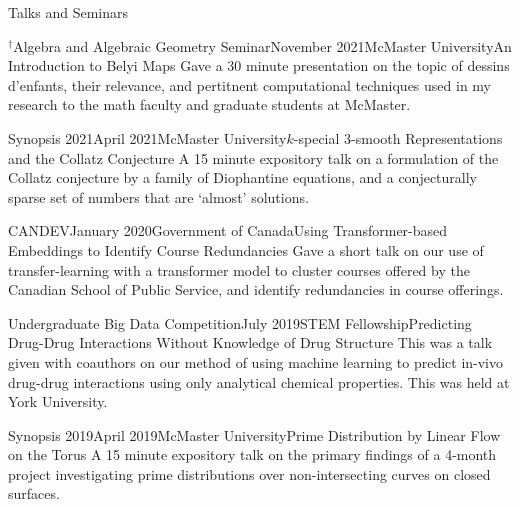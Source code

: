\begin{rSection}{Talks and Seminars}

\begin{rSubsection}{$^\dagger$Algebra and Algebraic Geometry Seminar}{November 2021}{McMaster University}{An Introduction to Belyi Maps}
	Gave a 30 minute presentation on the topic of dessins d'enfants, their relevance, and pertitnent computational techniques used in my research to the math faculty and graduate students at McMaster.
\end{rSubsection}
\smallskip

\begin{rSubsection}{Synopsis 2021}{April 2021}{McMaster University}{$k$-special $3$-smooth Representations and the Collatz Conjecture}
	A 15 minute expository talk on a formulation of the Collatz conjecture by a family of Diophantine equations, and a conjecturally sparse set of numbers that are `almost' solutions.
\end{rSubsection}
\smallskip

\begin{rSubsection}{CANDEV}{January 2020}{Government of Canada}{Using Transformer-based Embeddings to  Identify Course Redundancies}
	Gave a short talk on our use of transfer-learning with a transformer model to cluster courses offered by the Canadian School of Public Service, and identify redundancies in course offerings.
\end{rSubsection}
\smallskip

\begin{rSubsection}{Undergraduate Big Data Competition}{July 2019}{STEM Fellowship}{Predicting Drug-Drug Interactions Without Knowledge of Drug Structure}
	This was a talk given with coauthors on our method of using machine learning to predict in-vivo drug-drug interactions using only analytical chemical properties. This was held at York University.
\end{rSubsection}
\smallskip

\begin{rSubsection}{Synopsis 2019}{April 2019}{McMaster University}{Prime Distribution by Linear Flow on the Torus}
	A 15 minute expository talk on the primary findings of a 4-month project investigating prime distributions over non-intersecting curves on closed surfaces.
\end{rSubsection}
\smallskip




\end{rSection}
